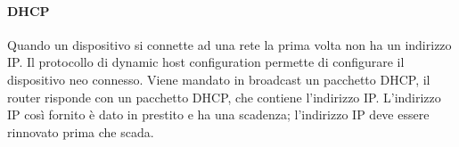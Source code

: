 \documentclass{article}
\begin{document}
\paragraph{DHCP}
Quando un dispositivo si connette ad una rete la prima volta non ha un indirizzo
IP. Il protocollo di dynamic host configuration permette di configurare il
dispositivo neo connesso. Viene mandato in broadcast un pacchetto DHCP, il
router risponde con un pacchetto DHCP, che contiene l'indirizzo IP. L'indirizzo
IP così fornito è dato in prestito e ha una scadenza; l'indirizzo IP deve essere
rinnovato prima che scada.\\ 
\end{document}
